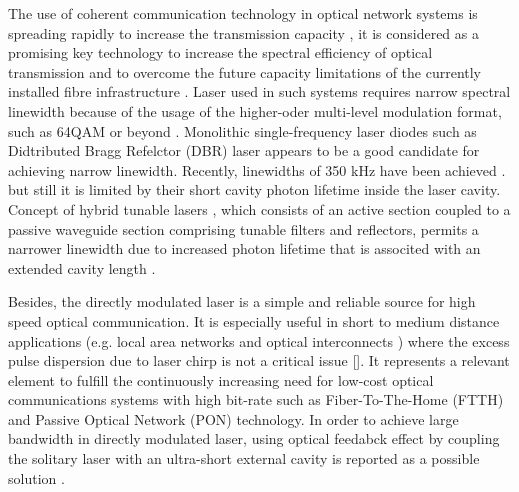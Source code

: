 The use of coherent communication technology in optical network systems is spreading rapidly to increase the transmission capacity \cite{ishii2017narrow}, it is considered as a promising key technology to increase the spectral efficiency of optical transmission and to overcome the future capacity limitations of the currently installed fibre infrastructure \cite{seimetz2008laser}. Laser used in such systems requires narrow spectral linewidth because of the usage of the higher-oder multi-level modulation format, such as 64QAM or beyond \cite{seimetz2008laser}. Monolithic single-frequency laser diodes such as Didtributed Bragg Refelctor (DBR) laser appears to be a good candidate for achieving narrow linewidth. Recently, linewidths of 350 kHz have been achieved \cite{de2016hybrid}. but still it is limited by their short cavity photon lifetime inside the laser cavity. 
Concept of hybrid tunable lasers \cite{fan2017spectral}, which consists of an active section coupled to a passive waveguide section comprising tunable filters and reflectors, permits a narrower linewidth due to increased photon lifetime that is associted with an extended cavity length \cite{henry1982theory}.


Besides, the directly modulated laser is a simple and reliable source for high speed optical communication. It is especially useful in short to medium distance applications (e.g. local area networks \cite{zhang2012next} and optical interconnects \cite{taubenblatt2012optical}) where the excess pulse dispersion due to laser chirp is not a critical issue []. It represents a relevant element to fulfill the continuously increasing need for low-cost optical communications systems with high bit-rate such as Fiber-To-The-Home (FTTH) \cite{cartaxo2011perspective, khanaa2013performance} and Passive Optical Network (PON) \cite{urata2012high, kani2010enabling} technology. In order to achieve large bandwidth in directly modulated laser, using optical feedabck effect by coupling the solitary laser with an ultra-short external cavity is reported as a possible solution \cite{ahmed2016modulation, mieda2016ultra}. 


